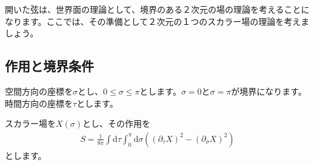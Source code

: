 \documentclass[report,paper=a4, fontsize=12pt, line_length=16cm, number_of_lines=33,dvipdfmx]{jlreq}
\numberwithin{equation}{chapter}
\numberwithin{equation}{section}
\newcommand{\del}{\partial}
\newcommand{\di}{\mathrm{d}}
\begin{document}
開いた弦は、世界面の理論として、境界のある２次元の場の理論を考えることになります。ここでは、その準備として２次元の１つのスカラー場の理論を考えましょう。

\subsection{作用と境界条件}

空間方向の座標を$\sigma$とし、$0\le \sigma \le \pi$とします。$\sigma=0$と$\sigma=\pi$が境界になります。時間方向の座標を$\tau$とします。

スカラー場を$X(\sigma)$とし、その作用を
\begin{align}
  S=\frac{1}{8\pi}\int \di \tau \int_{0}^{\pi}\di \sigma \left( (\del_{\tau}X)^2-(\del_{\sigma}X)^2 \right)
  \label{actionscalarwithboundary}
\end{align}
とします。
\end{document}
